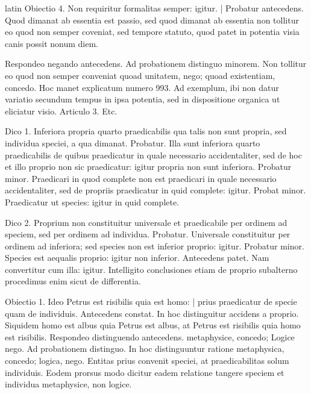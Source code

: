 \begin{otherlanguage*}{latin}
\pstart
Obiectio 4. Non requiritur formalitas semper:
igitur. \textnormal{|} Probatur antecedens. Quod dimanat ab essentia est passio, sed quod dimanat ab essentia non tollitur eo quod non semper coveniat, sed tempore statuto, quod patet in potentia visia canis possit nonum diem. 
\pend

\pstart
Respondeo negando antecedens. Ad probationem distinguo minorem. Non tollitur eo quod non semper conveniat quoad unitatem, nego; quoad existentiam, concedo. Hoc manet explicatum numero 993. Ad exemplum, ibi non datur variatio secundum tempus in ipsa potentia, sed in dispositione organica ut eliciatur visio. Articulo 3. Etc. 
\pend

\pstart
{}
\pend

\pstart
Dico 1. Inferiora propria quarto praedicabilis qua talis non sunt propria, sed individua speciei, a qua dimanat. Probatur. Illa sunt inferiora quarto praedicabilis de quibus praedicatur in quale necessario accidentaliter, sed de hoc et illo proprio non sic praedicatur:
igitur propria non sunt inferiora. Probatur minor. Praedicari in quod complete non est praedicari in quale necessario accidentaliter, sed de propriis praedicatur in quid complete:
igitur. Probat minor. Praedicatur ut species:
igitur in quid complete. 
\pend

\pstart
Dico 2. Proprium non constituitur universale et praedicabile per ordinem ad speciem, sed per ordinem ad individua. Probatur. Universale constituitur per ordinem ad inferiora; sed species non est inferior proprio:
igitur. Probatur minor. Species est aequalis proprio:
igitur non inferior. Antecedens patet. Nam convertitur cum illa:
igitur. Intelligito conclusiones etiam de proprio subalterno procedimus enim sicut de differentia. 
\pend

\pstart
Obiectio 1. Ideo Petrus est risibilis quia est homo:
\textnormal{|} prius praedicatur de specie quam de individuis. Antecedens constat. In hoc distinguitur accidens a proprio. Siquidem homo est albus quia Petrus est albus, at Petrus est risibilis quia homo est risibilis. Respondeo distinguendo antecedens. metaphysice, concedo; Logice nego. Ad probationem distinguo. In hoc distinguuntur ratione metaphysica, concedo; logica, nego. Entitas prius convenit speciei, at praedicabilitas solum individuis. Eodem prorsus modo dicitur eadem relatione tangere speciem et individua metaphysice, non logice. 
\pend


\end{otherlanguage*}
